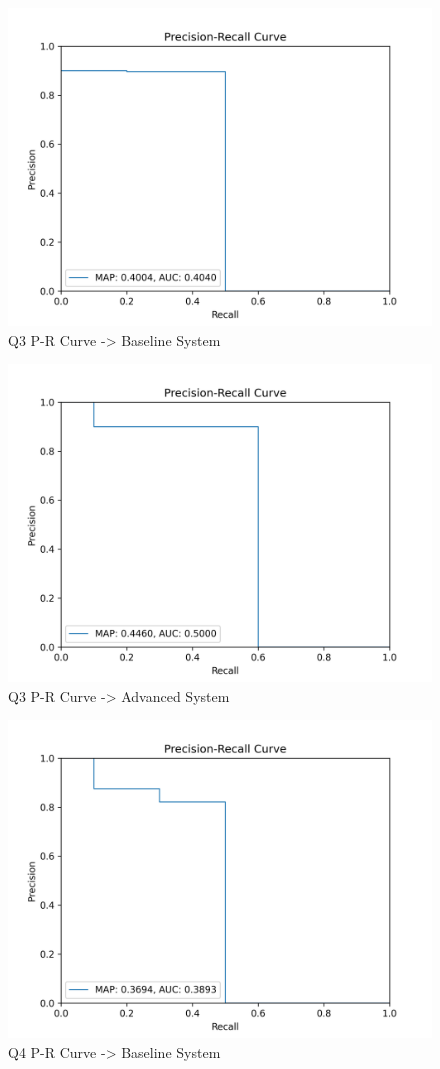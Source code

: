 \documentclass[sigconf]{acmart}
\begin{document}
\begin{figure}[H]
  \centering
  \includegraphics[width=0.8\linewidth]{precision_recall_q3b.png}
  \caption{Q3 P-R Curve -> Baseline System}
  \label{fig:precisionRecallBaseline3}
\end{figure}

\begin{figure}[H]
  \centering
  \includegraphics[width=0.8\linewidth]{precision_recall_q3a.png}
  \caption{Q3 P-R Curve -> Advanced System}
  \label{fig:precisionRecallAdvanced3}
\end{figure}
  
\begin{figure}[H]
  \centering
  \includegraphics[width=0.8\linewidth]{precision_recall_q4b.png}
  \caption{Q4 P-R Curve -> Baseline System}
  \label{fig:precisionRecallBaseline4}
\end{figure}
\end{document}
